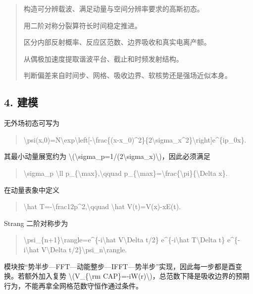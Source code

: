 \documentclass[UTF8,openany,11pt,fontset=fandol]{ctexbook}
\begin{document}
\begin{quote}
构造可分辨载波、满足动量与空间分辨率要求的高斯初态。

用二阶对称分裂算符长时间稳定推进。

区分内部反射概率、反应区范数、边界吸收和真实电离产额。

从偶极加速度提取谐波平台、截止和时频发射结构。

判断偏差来自时间步、网格、吸收边界、软核势还是强场近似本身。
\end{quote}

\subsection{\texorpdfstring{\textbf{4.
建模}}{4. 建模}}\label{ux5efaux6a21-1}

无外场初态可写为

\begin{quote}
\textbackslash psi(x,0)=N\textbackslash exp\textbackslash left{[}-\textbackslash frac\{(x-x\_0)\^{}2\}\{2\textbackslash sigma\_x\^{}2\}\textbackslash right{]}e\^{}\{ip\_0x\}.
\end{quote}

其最小动量展宽约为
\textbackslash(\textbackslash sigma\_p=1/(2\textbackslash sigma\_x)\textbackslash)，因此必须满足

\begin{quote}
\textbackslash sigma\_p \textbackslash ll
p\_\{\textbackslash max\},\textbackslash qquad
p\_\{\textbackslash max\}=\textbackslash frac\{\textbackslash pi\}\{\textbackslash Delta
x\}.
\end{quote}

在动量表象中定义

\begin{quote}
\textbackslash hat T=-\textbackslash frac12p\^{}2,\textbackslash qquad
\textbackslash hat V(t)=V(x)-xE(t).
\end{quote}

Strang 二阶对称步为

\begin{quote}
\textbar\textbackslash psi\_\{n+1\}\textbackslash rangle=e\^{}\{-i\textbackslash hat
V\textbackslash Delta t/2\} e\^{}\{-i\textbackslash hat
T\textbackslash Delta t\} e\^{}\{-i\textbackslash hat
V\textbackslash Delta
t/2\}\textbar\textbackslash psi\_n\textbackslash rangle.
\end{quote}

模块按``势半步---FFT---动能整步---IFFT---势半步''实现，因此每一步都是酉变换。若额外加入复势
\textbackslash(V\_\{\textbackslash rm
CAP\}=-iW(r)\textbackslash)，总范数下降是吸收边界的预期行为，不能再拿全网格范数守恒作通过条件。
\end{document}
